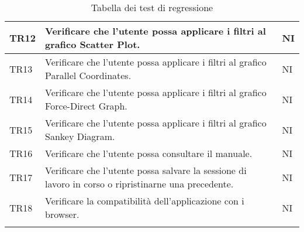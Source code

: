 \begin{center}
\begin{longtable}{|p{1.5cm}|p{11cm}|p{1cm}|}
            \rowcolor[HTML]{C0C0C0}
            TR12 & Verificare che l’utente possa applicare i filtri al grafico Scatter Plot. & NI\\ \hline
            \rowcolor[HTML]{EFEFEF}
            TR13 & Verificare che l’utente possa applicare i filtri al grafico Parallel Coordinates. & NI\\ \hline
            \rowcolor[HTML]{C0C0C0}
            TR14 & Verificare che l’utente possa applicare i filtri al grafico Force-Direct Graph. & NI\\ \hline
            \rowcolor[HTML]{EFEFEF}
            TR15 & Verificare che l’utente possa applicare i filtri al grafico Sankey Diagram. & NI\\ \hline
            \rowcolor[HTML]{C0C0C0}
            TR16 & Verificare che l’utente possa consultare il manuale. & NI\\ \hline
            \rowcolor[HTML]{EFEFEF}
            TR17 & Verificare che l’utente possa salvare la sessione di lavoro in corso o ripristinarne una precedente. & NI\\ \hline
            \rowcolor[HTML]{C0C0C0}
            TR18 & Verificare la compatibilità dell'applicazione con i browser. & NI\\ \hline
            \caption{Tabella dei test di regressione}
        \end{longtable}
    \end{center}


